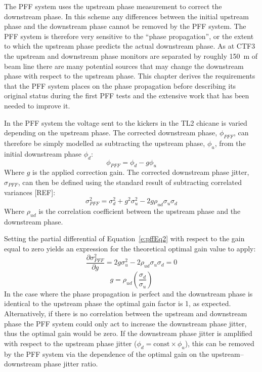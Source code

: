 
The PFF system uses the upstream phase measurement to correct the downstream phase. In this scheme any differences between the initial upstream phase and the downstream phase cannot be removed by the PFF system. The PFF system is therefore very sensitive to the ``phase propagation'', or the extent to which the upstream phase predicts the actual downstream phase. As at CTF3 the upstream and downstream phase monitors are separated by roughly 150~m of beam line there are many potential sources that may change the downstream phase with respect to the upstream phase. This chapter derives the requirements that the PFF system places on the phase propagation before describing its original status during the first PFF tests and the extensive work that has been needed to improve it.


In the PFF system the voltage sent to the kickers in the TL2 chicane is varied depending on the upstream phase. The corrected downstream phase, \(\phi_{PFF}\), can therefore be simply modelled as subtracting the upstream phase, \(\phi_u\), from the initial downstream phase \(\phi_d\):
\begin{equation}
\phi_{PFF} = \phi_d - g\phi_u
\label{e:pffEq1}
\end{equation}
Where \(g\) is the applied correction gain. The corrected downstream phase jitter, \(\sigma_{PFF}\), can then be defined using the standard result of subtracting correlated variances [REF]:
\begin{equation}
\sigma_{PFF}^2 = \sigma_d^2 + g^2\sigma_u^2 - 2g\rho_{ud}\sigma_u\sigma_d
\label{e:pffEq2}
\end{equation}
Where \(\rho_{ud}\) is the correlation coefficient between the upstream phase and the downstream phase. 

Setting the partial differential of Equation~\ref{e:pffEq2} with respect to the gain equal to zero yields an expression for the theoretical optimal gain value to apply:
\begin{equation}
\frac{\partial \sigma_{PFF}^2}{\partial g} = 2g\sigma_u^2 - 2\rho_{ud}\sigma_u\sigma_d = 0
\end{equation}
\begin{equation}
g = \rho_{ud}\left(\frac{\sigma_d}{\sigma_u}\right)
\label{e:theoretOptGain}
\end{equation}
In the case where the phase propagation is perfect and the downstream phase is identical to the upstream phase the optimal gain factor is 1, as expected. Alternatively, if there is no correlation between the upstream and downstream phase the PFF system could only act to increase the downstream phase jitter, thus the optimal gain would be zero. If the downstream phase jitter is amplified with respect to the upstream phase jitter (\(\phi_d = \mathrm{const}\times\phi_u\)), this can be removed by the PFF system via the dependence of the optimal gain on the upstream--downstream phase jitter ratio.


